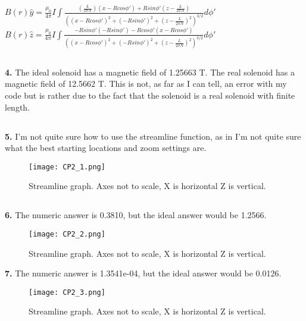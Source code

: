 \documentclass[english]{article}
\begin{document}
\begin{flushleft}
$B(r)\hat{y}=\frac{\mu_0}{4\pi}I\int\frac{(\frac{L}{2\pi N})(x-Rcos\phi')+Rsin\phi'(z-\frac{L}{2\pi N})}{((x-Rcos\phi')^2+(-Rsin\phi')^2+(z-\frac{L}{2\pi N})^2)^{3/2}}d\phi'$\\

$B(r)\hat{z}=\frac{\mu_0}{4\pi}I\int\frac{-Rsin\phi'(-Rsin\phi')-Rcos\phi'(x-Rcos\phi')}{((x-Rcos\phi')^2+(-Rsin\phi')^2+(z-\frac{L}{2\pi N})^2)^{3/2}}d\phi'$\\
\subsection*{}
\textbf{4.} The ideal solenoid has a magnetic field of 1.25663 T. The real solenoid has a magnetic field of 12.5662 T. This is not, as far as I can tell, an error with my code but is rather due to the fact that the solenoid is a real solenoid with finite length.
\subsection*{}
\textbf{5.} I'm not quite sure how to use the streamline function, as in I'm not quite sure what the best starting locations and zoom settings are. 
\begin{figure}[H]
\texttt{[image: CP2\_1.png]}
\caption{Streamline graph. Axes not to scale, X is horizontal Z is vertical.}
\end{figure}
\subsection*{}
\textbf{6.} The numeric answer is 0.3810, but the ideal answer would be 1.2566.
\begin{figure}[H]
\texttt{[image: CP2\_2.png]}
\caption{Streamline graph. Axes not to scale, X is horizontal Z is vertical.}
\end{figure}
\textbf{7.} The numeric answer is 1.3541e-04, but the ideal answer would be     0.0126.
\begin{figure}[H]
\texttt{[image: CP2\_3.png]}
\caption{Streamline graph. Axes not to scale, X is horizontal Z is vertical.}
\end{figure}
\end{flushleft}
\end{document}
